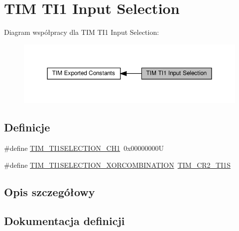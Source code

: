 \hypertarget{group___t_i_m___t_i1___selection}{}\section{T\+IM T\+I1 Input Selection}
\label{group___t_i_m___t_i1___selection}
Diagram współpracy dla T\+IM T\+I1 Input Selection\+:\nopagebreak
\begin{figure}[H]
\begin{center}
\leavevmode
\includegraphics[width=350pt]{group___t_i_m___t_i1___selection}
\end{center}
\end{figure}
\subsection*{Definicje}
\begin{DoxyCompactItemize}
\item 
\#define \hyperlink{group___t_i_m___t_i1___selection_gace6563bccf7635461f660fbed6241488}{T\+I\+M\+\_\+\+T\+I1\+S\+E\+L\+E\+C\+T\+I\+O\+N\+\_\+\+C\+H1}~0x00000000U
\item 
\#define \hyperlink{group___t_i_m___t_i1___selection_ga40dfcb0e3f2fdf0f45cbba227106310a}{T\+I\+M\+\_\+\+T\+I1\+S\+E\+L\+E\+C\+T\+I\+O\+N\+\_\+\+X\+O\+R\+C\+O\+M\+B\+I\+N\+A\+T\+I\+ON}~\hyperlink{group___peripheral___registers___bits___definition_gad07504497b70af628fa1aee8fe7ef63c}{T\+I\+M\+\_\+\+C\+R2\+\_\+\+T\+I1S}
\end{DoxyCompactItemize}


\subsection{Opis szczegółowy}


\subsection{Dokumentacja definicji}
\mbox{\label{group___t_i_m___t_i1___selection_gace6563bccf7635461f660fbed6241488}} 
